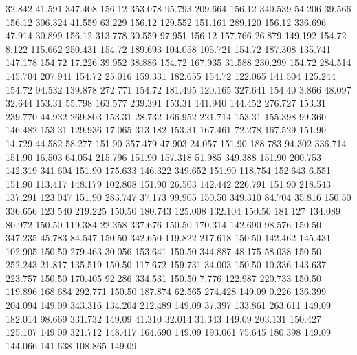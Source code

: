   32.842   41.591  347.408       156.12
 353.078   95.793  209.664       156.12
 340.539   54.206   39.566       156.12
 306.324   41.559   63.229       156.12
 129.552  151.161  289.120       156.12
 336.696   47.914   30.899       156.12
 313.778   30.559   97.951       156.12
 157.766   26.879  149.192       154.72
   8.122  115.662  250.431       154.72
 189.693  104.058  105.721       154.72
 187.308  135.741  147.178       154.72
  17.226   39.952   38.886       154.72
 167.935   31.588  230.299       154.72
 284.514  145.704  207.941       154.72
  25.016  159.331  182.655       154.72
 122.065  141.504  125.244       154.72
  94.532  139.878  272.771       154.72
 181.495  120.165  327.641       154.40
   3.866   48.097   32.644       153.31
  55.798  163.577  239.391       153.31
 141.940  144.452  276.727       153.31
 239.770   44.932  269.803       153.31
  28.732  166.952  221.714       153.31
 155.398   99.360  146.482       153.31
 129.936   17.065  313.182       153.31
 167.461   72.278  167.529       151.90
  14.729   44.582   58.277       151.90
 357.479   47.903   24.057       151.90
 188.783   94.302  336.714       151.90
  16.503   64.054  215.796       151.90
 157.318   51.985  349.388       151.90
 200.753  142.319  341.604       151.90
 175.633  146.322  349.652       151.90
 118.754  152.643    6.551       151.90
 113.417  148.179  102.808       151.90
  26.503  142.442  226.791       151.90
 218.543  137.291  123.047       151.90
 283.747   37.173   99.905       150.50
 349.310   84.704   35.816       150.50
 336.656  123.540  219.225       150.50
 180.743  125.008  132.104       150.50
 181.127  134.089   80.972       150.50
 119.384   22.358  337.676       150.50
 170.314  142.690   98.576       150.50
 347.235   45.783   84.547       150.50
 342.650  119.822  217.618       150.50
 142.462  145.431  102.905       150.50
 279.463   30.056  153.641       150.50
 344.887   48.175   58.038       150.50
 252.243   21.817  135.519       150.50
 117.672  159.731   34.003       150.50
  10.336  143.637  223.757       150.50
 170.405   92.286  334.531       150.50
   7.776  122.987  220.733       150.50
 119.896  168.684  292.771       150.50
 187.874   62.565  274.428       149.09
   0.226  136.399  204.094       149.09
 343.316  134.204  212.489       149.09
  37.397  133.861  263.611       149.09
 182.014   98.669  331.732       149.09
  41.310   32.014   31.343       149.09
 203.131  150.427  125.107       149.09
 321.712  148.417  164.690       149.09
 193.061   75.645  180.398       149.09
 144.066  141.638  108.865       149.09
